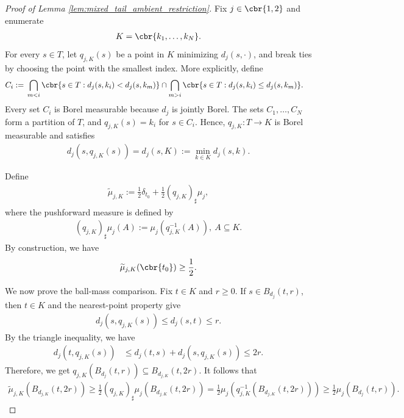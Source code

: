 \documentclass[11pt]{article}
\begin{document}
\begin{proof}[Proof of Lemma
\ref{lem:mixed_tail_ambient_restriction}]
Fix $j\in\cbr{1,2}$ and enumerate
\begin{align*}
K=\cbr{k_1,\ldots,k_N}.
\end{align*}
For every $s\in T$, let $q_{j,K}(s)$ be a point in $K$ minimizing
$d_j(s,\cdot)$, and break ties by choosing the point with the smallest
index. More explicitly, define
\begin{align*}
C_i
:={}&
\bigcap_{m<i}
\cbr{s\in T:d_j(s,k_i)<d_j(s,k_m)}
\cap
\bigcap_{m>i}
\cbr{s\in T:d_j(s,k_i)\le d_j(s,k_m)}.
\end{align*}
Every set $C_i$ is Borel measurable because $d_j$ is jointly Borel.
The sets $C_1,\ldots,C_N$ form a partition of $T$, and
$q_{j,K}(s)=k_i$ for $s\in C_i$. Hence, $q_{j,K}:T\to K$ is Borel
measurable and satisfies
\begin{align*}
d_j(s,q_{j,K}(s))
=
d_j(s,K)
:=
\min_{k\in K}d_j(s,k).
\end{align*}

Define
\begin{align*}
\widetilde\mu_{j,K}
:=
\frac12\delta_{t_0}
+
\frac12(q_{j,K})_\sharp\mu_j,
\end{align*}
where the pushforward measure is defined by
\begin{align*}
(q_{j,K})_\sharp\mu_j(A)
:=
\mu_j(q_{j,K}^{-1}(A)),
\ A\subseteq K.
\end{align*}
By construction, we have
\begin{align*}
\widetilde\mu_{j,K}(\cbr{t_0})\ge\frac12.
\end{align*}

We now prove the ball-mass comparison. Fix $t\in K$ and $r\ge0$.
If $s\in B_{d_j}(t,r)$, then $t\in K$ and the nearest-point property
give
\begin{align*}
d_j(s,q_{j,K}(s))
\le
d_j(s,t)
\le r.
\end{align*}
By the triangle inequality, we have
\begin{align*}
d_j(t,q_{j,K}(s))
&\le
d_j(t,s)+d_j(s,q_{j,K}(s))\le2r.
\end{align*}
Therefore, we get $q_{j,K}(B_{d_j}(t,r))
\subseteq
B_{d_{j,K}}(t,2r)$.
It follows that
\begin{align*}
\widetilde\mu_{j,K}(B_{d_{j,K}}(t,2r))\ge
\frac12
(q_{j,K})_\sharp\mu_j(B_{d_{j,K}}(t,2r))=
\frac12
\mu_j(q_{j,K}^{-1}(B_{d_{j,K}}(t,2r)))\ge
\frac12\mu_j(B_{d_j}(t,r)).
\end{align*}


\end{proof}
\end{document}
